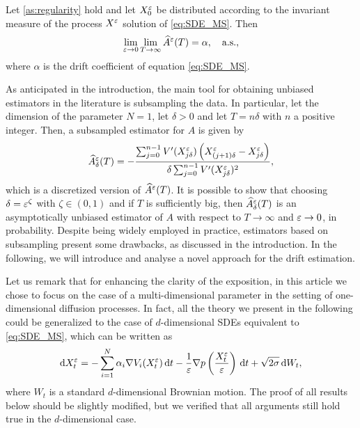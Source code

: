 \documentclass[review,onefignum,onetabnum]{siamonline190516}
\begin{document}
\begin{theorem}\label{thm:Bias} Let \cref{as:regularity} hold and let $X^\varepsilon_0$ be distributed according to the invariant measure of the process $X^\varepsilon$ solution of \eqref{eq:SDE_MS}. Then
	\begin{equation}
		\lim_{\varepsilon \to 0}\lim_{T \to \infty} \widehat A^\varepsilon(T) = \alpha, \quad \text{a.s.},
	\end{equation}
	where $\alpha$ is the drift coefficient of equation \eqref{eq:SDE_MS}.
\end{theorem}

As anticipated in the introduction, the main tool for obtaining unbiased estimators in the literature is subsampling the data. In particular, let the dimension of the parameter $N = 1$, let $\delta > 0$ and let $T = n\delta$ with $n$ a positive integer. Then, a subsampled estimator for $A$ is given by
\begin{equation}
	\widehat A^\varepsilon_\delta(T) = - \frac{\sum_{j=0}^{n-1} V'(X^\varepsilon_{j\delta})\left(X^\varepsilon_{(j+1)\delta} - X^\varepsilon_{j\delta}\right)}{\delta \sum_{j=0}^{n-1} V'(X^\varepsilon_{j\delta})^2},
\end{equation}
which is a discretized version of $\widehat A^\varepsilon(T)$. It is possible to show \cite[Theorem 3.5]{PaS07} that choosing $\delta = \varepsilon^\zeta$ with $\zeta \in (0, 1)$ and if $T$ is sufficiently big, then $\widehat A^\varepsilon_\delta(T)$ is an asymptotically unbiased estimator of $A$ with respect to $T \to \infty$ and $\varepsilon \to 0$, in probability. Despite being widely employed in practice, estimators based on subsampling present some drawbacks, as discussed in the introduction. In the following, we will introduce and analyse a novel approach for the drift estimation.

\begin{remark} Let us remark that for enhancing the clarity of the exposition, in this article we chose to focus on the case of a multi-dimensional parameter in the setting of one-dimensional diffusion processes. In fact, all the theory we present in the following could be generalized to the case of $d$-dimensional SDEs equivalent to \eqref{eq:SDE_MS}, which can be written as
	\begin{equation}
		\mathrm{d} X_t^\varepsilon = - \sum_{i=1}^N \alpha_i \nabla V_i(X_t^\varepsilon) \,\mathrm{d} t - \frac1{\varepsilon} \nabla p\left(\frac{X_t^\varepsilon}{\varepsilon}\right) \,\mathrm{d} t + \sqrt{2\sigma} \,\mathrm{d} W_t,
	\end{equation}
	where $W_t$ is a standard $d$-dimensional Brownian motion. The proof of all results below should be slightly modified, but we verified that all arguments still hold true in the $d$-dimensional case. 
\end{remark}
\end{document}
